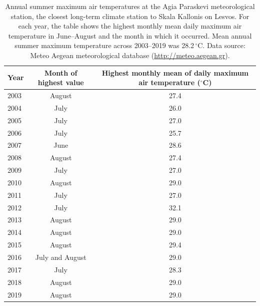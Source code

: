 \documentclass[11pt,a4paper]{article}
\begin{document}
\begin{table}[!htbp]
\centering
\begingroup
\fontsize{9}{11}\selectfont

\caption{Annual summer maximum air temperatures at the Agia Paraskevi meteorological station, the closest long-term climate station to Skala Kallonis on Lesvos. For each year, the table shows the highest monthly mean daily maximum air temperature in June--August and the month in which it occurred. Mean annual summer maximum temperature across 2003--2019 was 28.2\,$^\circ$C. Data source: Meteo Aegean meteorological database (\url{http://meteo.aegean.gr}).}
\label{tab:supp_tmax}

\setlength{\tabcolsep}{5pt}

\begin{tabular}{lcc}
\toprule
Year & Month of highest value & Highest monthly mean of daily maximum air temperature ($^\circ$C) \\
\midrule
2003 & August & 27.4 \\
2004 & July & 26.0 \\
2005 & July & 27.0 \\
2006 & July & 25.7 \\
2007 & June & 28.6 \\
2008 & August & 27.4 \\
2009 & July & 27.0 \\
2010 & August & 29.0 \\
2011 & July & 27.0 \\
2012 & July & 32.1 \\
2013 & August & 29.0 \\
2014 & August & 29.0 \\
2015 & August & 29.4 \\
2016 & July and August & 29.0 \\
2017 & July & 28.3 \\
2018 & August & 29.0 \\
2019 & August & 29.0 \\
\bottomrule
\end{tabular}

\endgroup
\end{table}

\end{document}
